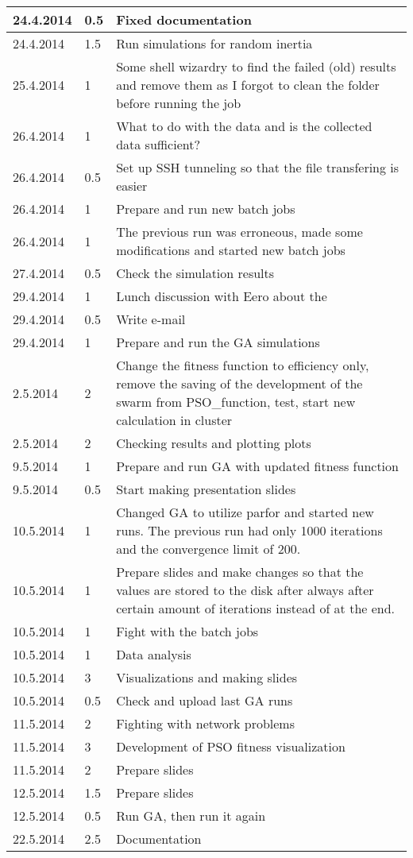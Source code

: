 \documentclass[twoside]{article}
\begin{document}
\begin{longtable}{ | l | l | p{10cm} | }
	24.4.2014 & 0.5 & Fixed documentation \\ \hline
	24.4.2014 & 1.5 & Run simulations for random inertia \\ \hline
	25.4.2014 & 1 & Some shell wizardry to find the failed (old) results and remove them as I forgot to clean the folder before running the job \\ \hline
	26.4.2014 & 1 & What to do with the data and is the collected data sufficient? \\ \hline
	26.4.2014 & 0.5 & Set up SSH tunneling so that the file transfering is easier \\ \hline
	26.4.2014 & 1 & Prepare and run new batch jobs \\ \hline
	26.4.2014 & 1 & The previous run was erroneous, made some modifications and started new batch jobs \\ \hline
	27.4.2014 & 0.5 & Check the simulation results \\ \hline
	29.4.2014 & 1 & Lunch discussion with Eero about the \\ \hline
	29.4.2014 & 0.5 & Write e-mail \\ \hline
	29.4.2014 & 1 & Prepare and run the GA simulations \\ \hline
	2.5.2014 & 2 & Change the fitness function to efficiency only, remove the saving of the development of the swarm from PSO\_function, test, start new calculation in cluster \\ \hline
	2.5.2014 & 2 & Checking results and plotting plots \\ \hline
	9.5.2014 & 1 & Prepare and run GA with updated fitness function \\ \hline
	9.5.2014 & 0.5 & Start making presentation slides \\ \hline
	10.5.2014 & 1 & Changed GA to utilize parfor and started new runs. The previous run had only 1000 iterations and the convergence limit of 200. \\ \hline
	10.5.2014 & 1 & Prepare slides and make changes so that the values are stored to the disk after always after certain amount of iterations instead of at the end. \\ \hline
	10.5.2014 & 1 & Fight with the batch jobs \\ \hline
	10.5.2014 & 1 & Data analysis \\ \hline
	10.5.2014 & 3 & Visualizations and making slides \\ \hline
	10.5.2014 & 0.5 & Check and upload last GA runs \\ \hline
	11.5.2014 & 2 & Fighting with network problems \\ \hline
	11.5.2014 & 3 & Development of PSO fitness visualization \\ \hline
	11.5.2014 & 2 & Prepare slides \\ \hline
	12.5.2014 & 1.5 & Prepare slides \\ \hline
	12.5.2014 & 0.5 & Run GA, then run it again \\ \hline
	22.5.2014 & 2.5 & Documentation \\ \hline
	

\end{longtable}
\end{document}
